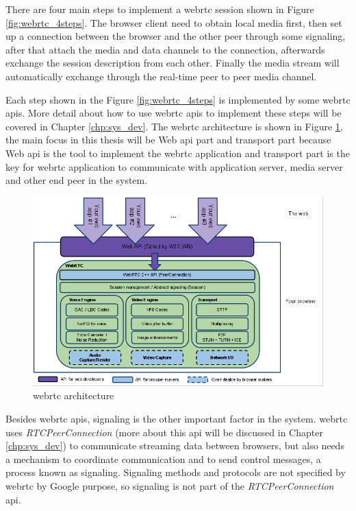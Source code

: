 \noindent There are four main steps to implement a \gls{webrtc} session shown in Figure \ref{fig:webrtc_4steps}. The browser client need to obtain local media first, then set up a connection between the browser and the other peer through some signaling, after that attach the media and data channels to the connection, afterwards exchange the session description from each other. Finally the media stream will automatically exchange through the real-time peer to peer media channel.

\par Each step shown in the Figure \ref{fig:webrtc_4steps} is implemented by some \gls{webrtc} \gls{api}s. More detail about how to use \gls{webrtc} \gls{api}s to implement these steps will be covered in Chapter \ref{chp:sys_dev}. The \gls{webrtc} architecture is shown in Figure \ref{fig:webrtc_api_arch}, the main focus in this thesis will be Web \gls{api} part and transport part because Web \gls{api} is the tool to implement the \gls{webrtc} application and transport part is the key for \gls{webrtc} application to communicate with application server, media server and other end peer in the system. 

\begin{figure}
	\centering
    	\includegraphics[width=0.60\textheight,natwidth=610,natheight=642]{figs/WebRTCapiPic.png}
  	\caption{\gls{webrtc} architecture \cite{org:webrtc}}
  	\label{fig:webrtc_api_arch}
\end{figure}

\par Besides \gls{webrtc} \gls{api}s, signaling is the other important factor in the system. \gls{webrtc} uses \textit{RTCPeerConnection} (more about this \gls{api} will be discussed in Chapter \ref{chp:sys_dev}) to communicate streaming data between browsers, but also needs a mechanism to coordinate communication and to send control messages, a process known as signaling. Signaling methods and protocols are not specified by \gls{webrtc} by Google purpose, so signaling is not part of the \textit{RTCPeerConnection} \gls{api}.

